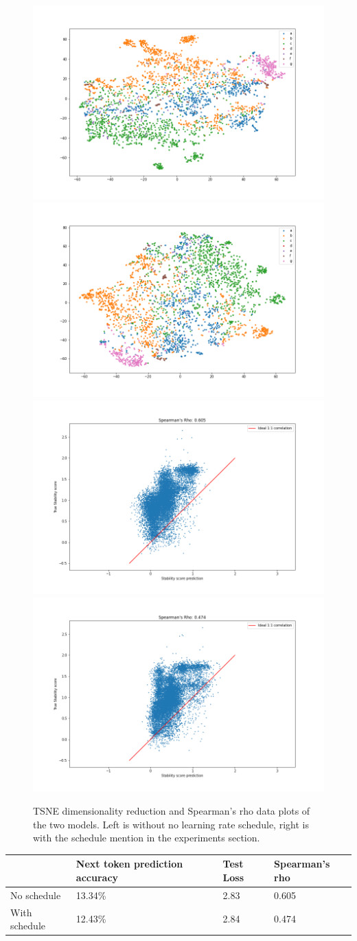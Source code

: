 \begin{figure}[!ht]
  \centering
  \includegraphics[width=0.49\linewidth]{latex/imgs/tsne_1_layer_no_schedule_512_final.png}
  \includegraphics[width=0.49\linewidth]{latex/imgs/tsne_1_layer_with_schedule_512_final.png}
  \includegraphics[width=0.49\linewidth]{latex/imgs/spearman_1_layer_no_schedule_512_final.png}
  \includegraphics[width=0.49\linewidth]{latex/imgs/spearman_1_layer_with_schedule_512_final.png}
  \caption{TSNE dimensionality reduction  and Spearman's rho data plots of the two models. Left is without no learning rate schedule, right is with the schedule mention in the experiments section.}
\end{figure}

\begin{table}[!ht]
\begin{tabular}{|l|l|l|l|}
\hline
              & Next token prediction accuracy & Test Loss & Spearman's rho\\ \hline
No schedule   & 13.34\%                        & 2.83      & 0.605         \\ \hline
With schedule & 12.43\%                        & 2.84      & 0.474         \\ \hline
\end{tabular}
\end{table}